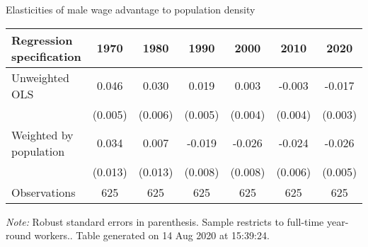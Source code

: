 \begin{center}
\begin{threeparttable}[!h]
\caption{Elasticities of male wage advantage to population density}
\label{tab:elast}
\begin{tabular}{lcccccc}
\toprule
\toprule
\textbf{Regression specification}&\multicolumn{1}{c}{\textbf{1970}}&\multicolumn{1}{c}{\textbf{1980}}&\multicolumn{1}{c}{\textbf{1990}}&\multicolumn{1}{c}{\textbf{2000}}&\multicolumn{1}{c}{\textbf{2010}}&\multicolumn{1}{c}{\textbf{2020}} \\
\midrule
Unweighted OLS      &       0.046\sym{***}&       0.030\sym{***}&       0.019\sym{***}&       0.003         &      -0.003         &      -0.017\sym{***}\\
                    &     (0.005)         &     (0.006)         &     (0.005)         &     (0.004)         &     (0.004)         &     (0.003)         \\
Weighted by population&       0.034\sym{**} &       0.007         &      -0.019\sym{*}  &      -0.026\sym{**} &      -0.024\sym{***}&      -0.026\sym{***}\\
                    &     (0.013)         &     (0.013)         &     (0.008)         &     (0.008)         &     (0.006)         &     (0.005)         \\
\midrule Observations&         625         &         625         &         625         &         625         &         625         &         625         \\
\bottomrule
\bottomrule
\end{tabular}
\begin{tablenotes}
\item \footnotesize \textit{Note:} Robust standard errors in parenthesis. Sample restricts to full-time year-round workers.. Table generated on 14 Aug 2020 at 15:39:24.
\end{tablenotes}
\end{threeparttable}
\end{center}
